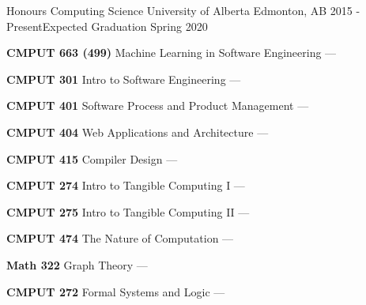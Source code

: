 
\begin{cventries}
  \cventry
    {Honours Computing Science} %
    {University of Alberta} %
    {Edmonton, AB} %
    {2015 - Present\newline Expected Graduation Spring 2020} %
    {
      \begin{multicols}{2}
        \begin{cvitems} %
        \item {\textbf{CMPUT 663 (499)} Machine Learning in Software Engineering --- }
          \vspace{0.5mm}
        \item {\textbf{CMPUT 301} Intro to Software Engineering --- }
          \vspace{0.5mm}
        \item {\textbf{CMPUT 401} Software Process and Product Management --- }
          \vspace{0.5mm}
        \item {\textbf{CMPUT 404} Web Applications and Architecture --- }
          \vspace{0.5mm}
        \item {\textbf{CMPUT 415} Compiler Design --- }
          \vspace{0.5mm}
        \item {\textbf{CMPUT 274} Intro to Tangible Computing I --- }
          \vspace{0.5mm}
        \item {\textbf{CMPUT 275} Intro to Tangible Computing II --- }
          \vspace{1.5mm}
        \item {\textbf{CMPUT 474} The Nature of Computation --- }
          \vspace{0.5mm}
        \item {\textbf{Math 322} Graph Theory --- }
          \vspace{0.5mm}
        \item {\textbf{CMPUT 272} Formal Systems and Logic --- }
          \vspace{0.5mm}

\end{cvitems}
\end{multicols}}
\end{cventries}
